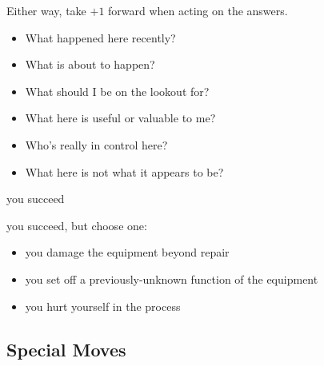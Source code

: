
Either way, take $+1$ forward when acting on the answers.

\begin{itemize}
\item What happened here recently?
\item What is about to happen?
\item What should I be on the lookout for?
\item What here is useful or valuable to me?
\item Who's really in control here?
\item What here is not what it appears to be?
\end{itemize}


{you succeed}
{you succeed, but choose one:
\begin{itemize}
\item you damage the equipment beyond repair
\item you set off a previously-unknown function of the equipment
\item you hurt yourself in the process
\end{itemize}}

\subsection{Special Moves}

